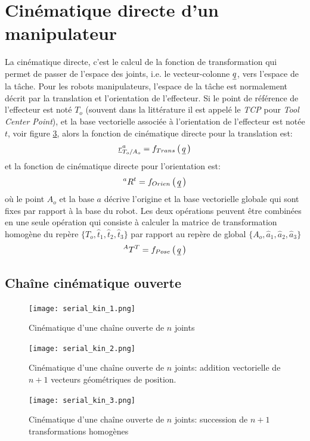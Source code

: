 \newpage
\section{Cinématique directe d'un manipulateur}
\label{sec:fwdkin}

La cinématique directe, c'est le calcul de la fonction de transformation qui permet de passer de l'espace des joints, i.e. le vecteur-colonne $\underline{q}$, vers l'espace de la tâche. Pour les robots manipulateurs, l'espace de la tâche est normalement décrit par la translation et l'orientation de l'effecteur.  Si le point de référence de l'effecteur est noté $T_o$ (souvent dans la littérature il est appelé le \textit{TCP} pour \textit{Tool Center Point}), et la base vectorielle associée à l'orientation de l'effecteur est notée $t$, voir figure \ref{fig:serial_kin_3}, alors la fonction de cinématique directe pour la translation est:
\begin{equation}
\underline{r}_{T_o/A_o}^a = f_{Trans}\left( \, \underline{q} \, \right)
\label{eq:kinfwdtrans} 
\end{equation}
et la fonction de cinématique directe pour l'orientation est:
\begin{equation}
{}^aR^t = f_{Orien}\left( \, \underline{q} \, \right)
\label{eq:kinfwdrot} 
\end{equation}
où le point $A_o$ et la base $a$ décrive l'origine et la base vectorielle globale qui sont fixes par rapport à la base du robot. Les deux opérations peuvent être combinées en une seule opération qui consiste à calculer la matrice de transformation homogène du repère $\{T_o,\hat{t}_1,\hat{t}_2,\hat{t}_3\}$ par rapport au repère de global $\{A_o,\hat{a}_1,\hat{a}_2,\hat{a}_3\}$
\begin{equation}
{}^AT^T = f_{Pose}\left( \, \underline{q} \, \right)
\label{eq:kinfwdpose} 
\end{equation}


\subsection{Chaîne cinématique ouverte}

\begin{figure}[p]
	\centering
		\texttt{[image: serial\_kin\_1.png]}
	\caption{Cinématique d'une chaîne ouverte de $n$ joints}
	\label{fig:serial_kin_1}
\end{figure}
\begin{figure}[p]
	\centering
		\texttt{[image: serial\_kin\_2.png]}
	\caption{Cinématique d'une chaîne ouverte de $n$ joints: addition vectorielle de $n+1$ vecteurs géométriques de position.}
	\label{fig:serial_kin_2}
\end{figure}
\begin{figure}[p]
	\centering
		\texttt{[image: serial\_kin\_3.png]}
	\caption{Cinématique d'une chaîne ouverte de $n$ joints: succession de $n+1$ transformations homogènes}
	\label{fig:serial_kin_3}
\end{figure}

